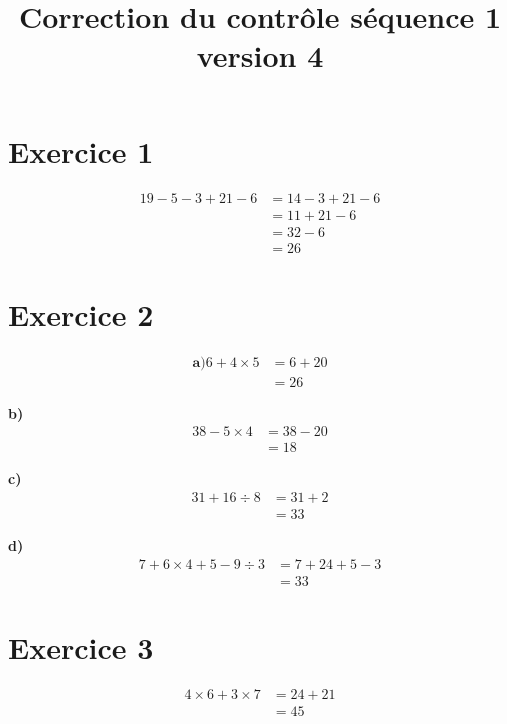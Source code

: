 \documentclass[12pt]{extarticle}
\title{\textbf{Correction du contrôle séquence 1 version 4}}
\author{}
\date{}
\begin{document}
\maketitle

\section*{Exercice 1}
\begin{align*}
19 - 5 - 3 + 21 - 6 &= 14 - 3 + 21 - 6 \\
                     &= 11 + 21 - 6 \\
                     &= 32 - 6 \\
                     &= 26
\end{align*}

\section*{Exercice 2}

\begin{align*}
\textbf{a)}
6 + 4 \times 5 &= 6 + 20 \\
               &= 26
\end{align*}

\textbf{b)}
\begin{align*}
38 - 5 \times 4 &= 38 - 20 \\
                &= 18
\end{align*}

\textbf{c)}
\begin{align*}
31 + 16 \div 8 &= 31 + 2 \\
               &= 33
\end{align*}

\textbf{d)}
\begin{align*}
7 + 6 \times 4 + 5 - 9 \div 3 &= 7 + 24 + 5 - 3 \\
                              &= 33
\end{align*}

\section*{Exercice 3}
\begin{align*}
4 \times 6 + 3 \times 7 &= 24 + 21 \\
                        &= 45
\end{align*}
\end{document}
